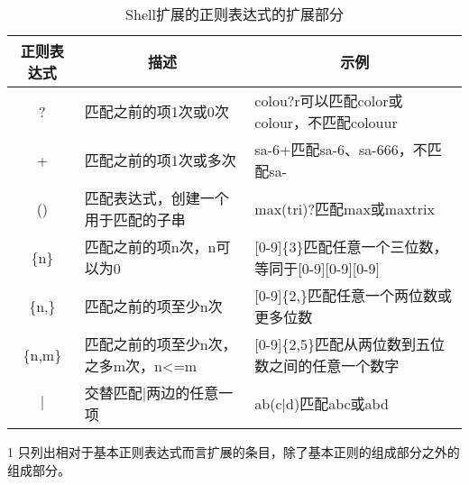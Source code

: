 \begin{table}[p]
	\renewcommand{\arraystretch}{1.5}
	\newcommand{\tc}[1]{\multicolumn{1}{c}{#1}}
	\newcommand{\tl}[1]{\multicolumn{1}{l}{#1}}
	\newcommand{\tr}[1]{\multicolumn{1}{r}{#1}}
	\centering
	\begin{sideways}
		\begin{minipage}{\textheight}
			\caption[extregexp]{Shell扩展的正则表达式的扩展部分}
			\vspace{0.8em}\centering\wuhao
			\begin{threeparttable}
				\begin{tabular}{cll}
					\toprule[2pt]
					\textbf{正则表达式} & \tc{\textbf{描述}} & \tc{\textbf{示例}}\\[2pt]
					\midrule[0.8pt]
					? & 匹配之前的项1次或0次 & colou?r可以匹配color或colour，不匹配colouur\\[8pt]
					+ & 匹配之前的项1次或多次 & sa-6+匹配sa-6、sa-666，不匹配sa-\\[8pt]
					() & 匹配表达式，创建一个用于匹配的子串 & max(tri)?匹配max或maxtrix\\[8pt]
					\{n\} & 匹配之前的项n次，n可以为0 & [0-9]\{3\}匹配任意一个三位数，等同于[0-9][0-9][0-9]\\[8pt]
					\{n,\} & 匹配之前的项至少n次 & [0-9]\{2,\}匹配任意一个两位数或更多位数\\[8pt]
					\{n,m\} & 匹配之前的项至少n次，之多m次，n<=m & [0-9]\{2,5\}匹配从两位数到五位数之间的任意一个数字\\[8pt]
					$\mid$ & 交替匹配$\mid$两边的任意一项 & ab(c$\mid$d)匹配abc或abd\\[8pt]
					\bottomrule[2pt]
				\end{tabular}

				\begin{tablenotes}
					\footnotesize
					\item[1] 只列出相对于基本正则表达式而言扩展的条目，除了基本正则的组成部分之外的组成部分。
				\end{tablenotes}
			\end{threeparttable}
		\end{minipage}
	\end{sideways}
\end{table}

